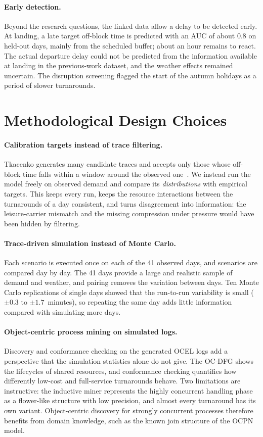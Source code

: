 \paragraph{Early detection.}
Beyond the research questions, the linked data allow a delay to be detected early. At landing, a late target off-block time is predicted with an AUC of about 0.8 on held-out days, mainly from the scheduled buffer; about an hour remains to react. The actual departure delay could not be predicted from the information available at landing in the previous-work dataset, and the weather effects remained uncertain. The disruption screening flagged the start of the autumn holidays as a period of slower turnarounds.

\section{Methodological Design Choices}

\paragraph{Calibration targets instead of trace filtering.}
Tkacenko generates many candidate traces and accepts only those whose off-block time falls within a window around the observed one~\cite{tkacenko2026}. We instead run the model freely on observed demand and compare its \emph{distributions} with empirical targets. This keeps every run, keeps the resource interactions between the turnarounds of a day consistent, and turns disagreement into information: the leisure-carrier mismatch and the missing compression under pressure would have been hidden by filtering.

\paragraph{Trace-driven simulation instead of Monte Carlo.}
Each scenario is executed once on each of the 41 observed days, and scenarios are compared day by day. The 41 days provide a large and realistic sample of demand and weather, and pairing removes the variation between days. Ten Monte Carlo replications of single days showed that the run-to-run variability is small ($\pm0.3$ to $\pm1.7$~minutes), so repeating the same day adds little information compared with simulating more days.

\paragraph{Object-centric process mining on simulated logs.}
Discovery and conformance checking on the generated OCEL logs add a perspective that the simulation statistics alone do not give. The OC-DFG shows the lifecycles of shared resources, and conformance checking quantifies how differently low-cost and full-service turnarounds behave. Two limitations are instructive: the inductive miner represents the highly concurrent handling phase as a flower-like structure with low precision, and almost every turnaround has its own variant. Object-centric discovery for strongly concurrent processes therefore benefits from domain knowledge, such as the known join structure of the OCPN model.

